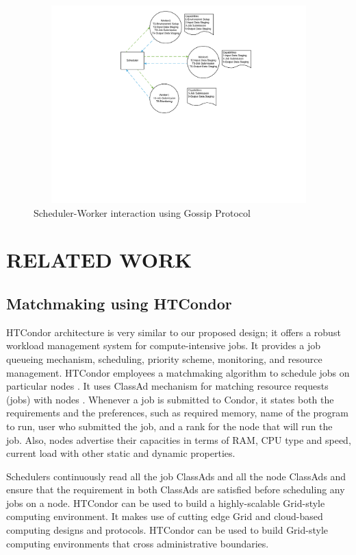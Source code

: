 \documentclass[sigconf]{acmart}
\begin{document}
\begin{figure}
\includegraphics[height=3in, width=7in]{figures/scheduler-push-mechanism.pdf}
\caption{Scheduler-Worker interaction using Gossip Protocol}
\end{figure}

\section{RELATED WORK}

\subsection{Matchmaking using HTCondor}
HTCondor architecture is very similar to our proposed design; it offers a robust workload management system for compute-intensive jobs. It provides a job queueing mechanism, scheduling, priority scheme, monitoring, and resource management. HTCondor employees a matchmaking algorithm to schedule jobs on particular nodes \cite{coleman2001implementation}. It uses ClassAd mechanism for matching resource requests (jobs) with nodes \cite{coleman2003distributed}. Whenever a job is submitted to Condor, it states both the requirements and the preferences, such as required memory, name of the program to run, user who submitted the job, and a rank for the node that will run the job. Also, nodes advertise their capacities in terms of RAM, CPU type and speed, current load with other static and dynamic properties.

Schedulers continuously read all the job ClassAds and all the node ClassAds and ensure that the requirement in both ClassAds are satisfied before scheduling any jobs on a node. HTCondor can be used to build a highly-scalable Grid-style computing environment.  It makes use of cutting edge Grid and cloud-based computing designs and protocols. HTCondor can be used to build Grid-style computing environments that cross administrative boundaries. 
\end{document}
